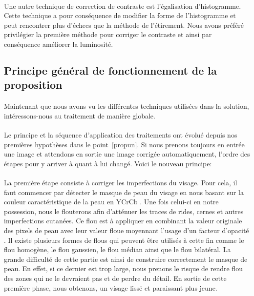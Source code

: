 \documentclass[11pt, french]{report-rd-info}
\begin{document}
\paragraph*{}
Une autre technique de correction de contraste est l'égalisation d'histogramme. Cette technique a pour conséquence de modifier la forme de l'histogramme et peut rencontrer plus d'échecs que la méthode de l'étirement. Nous avons préféré privilégier la première méthode pour corriger le contraste et ainsi par conséquence améliorer la luminosité.

\subsection{Principe général de fonctionnement de la proposition}
\label{part:principegeneral}
\paragraph*{}
Maintenant que nous avons vu les différentes techniques utilisées dans la solution, intéressons-nous au traitement de manière globale.
\paragraph*{}
Le principe et la séquence d'application des traitements ont évolué depuis nos premières hypothèses dans le point~\ref{propun}. Si nous prenons toujours en entrée une image et attendons en sortie une image corrigée automatiquement, l'ordre des étapes pour y arriver à quant à lui changé. Voici le nouveau principe:
\paragraph*{}
La première étape consiste à corriger les imperfections du visage. Pour cela, il faut commencer par détecter le masque de peau du visage en nous basant sur la couleur caractéristique de la peau en YCrCb \cite{Kukharev2004}. 
Une fois celui-ci en notre possession, nous le flouterons afin d'atténuer les traces de rides, cernes et autres imperfections cutanées. Ce flou est à appliquer en combinant la valeur originale des pixels de peau avec leur valeur floue moyennant l'usage d'un facteur d'opacité \cite{Lee}. Il existe plusieurs formes de flous qui peuvent être utilisés à cette fin comme le flou homogène, le flou gaussien, le flou médian ainsi que le flou bilatéral.
La grande difficulté de cette partie est ainsi de construire correctement le masque de peau. En effet, si ce dernier est trop large, nous prenons le risque de rendre flou des zones qui ne le devraient pas et de perdre du détail.
En sortie de cette première phase, nous obtenons, un visage lissé et paraissant plus jeune.
\end{document}
